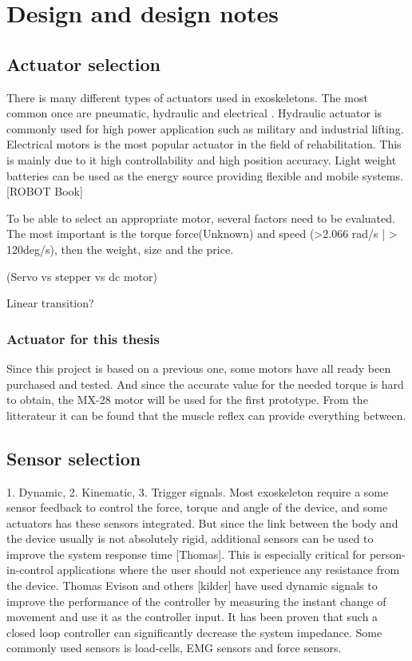 \chapter{Design and design notes}

\section{Actuator selection}
There is many different types of actuators used in exoskeletons. The most common once are pneumatic, hydraulic and electrical \citep{maciejasz2014survey}. Hydraulic actuator is commonly used for high power application such as military and industrial lifting. Electrical motors is the most popular actuator in the field of rehabilitation. This is mainly due to it high controllability and high position accuracy. Light weight batteries can be used as the energy source providing flexible and mobile systems. [ROBOT Book]

To be able to select an appropriate motor, several factors need to be evaluated. The most important is the torque force(Unknown) and speed (>2.066 rad/s | > 120deg/s), then the weight, size and the price.

(Servo vs stepper vs dc motor) 

Linear transition? 

\subsection{Actuator for this thesis}
Since this project is based on a previous one, some motors have all ready been purchased and tested. And since the accurate value for the needed torque is hard to obtain, the MX-28 motor will be used for the first prototype. From the litterateur it can be found that the muscle reflex can provide everything between. 


\section{Sensor selection}
1. Dynamic, 2. Kinematic, 3. Trigger signals. 
Most exoskeleton require a some sensor feedback to control the force, torque and angle of the device, and some actuators has these sensors integrated. But since the link between the body and the device usually is not absolutely rigid, additional sensors can be used to improve the system response time [Thomas]. This is especially critical for person-in-control applications where the user should not experience any resistance from the device. Thomas Evison and others [kilder] have used dynamic signals to improve the performance of the controller by measuring the instant change of movement and use it as the controller input. It has been proven that such a closed loop controller can significantly decrease the system impedance. Some commonly used sensors is load-cells, EMG sensors and force sensors. 

